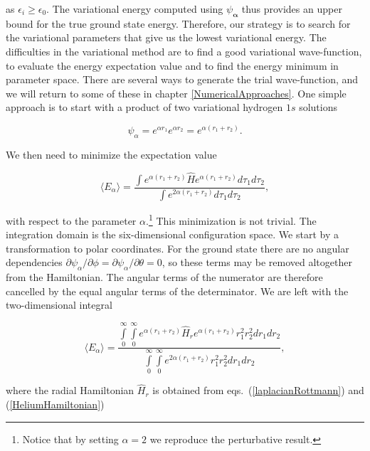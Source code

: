 as $\epsilon_{i} \ge \epsilon_{0}$. The variational energy
computed using $\psi_{\mathbf{\alpha}}$ thus provides an upper bound
for the true ground state energy. Therefore, our strategy is to 
search for the variational parameters that give us the lowest
variational energy. 
\newline
%
\newline
The difficulties in the variational method are to find a good
variational wave-function, to evaluate the energy expectation value and
to find the energy minimum in parameter space. There are several ways
to generate the trial wave-function, and we will return to some of
these in chapter \ref{NumericalApproaches}. One simple approach is to
start with a product of two variational hydrogen $1s$ solutions 

\begin{equation*} 
  \psi_{\alpha} 
  = e^{\alpha r_1}e^{\alpha r_2} = e^{\alpha (r_1+r_2)}.
\end{equation*}

We then need to minimize the expectation value

\begin{equation*} 
  \langle E_{\alpha} \rangle = 
  \frac{\int e^{\alpha (r_1+r_2)} \hat{H} e^{\alpha (r_1+r_2)}
  d\tau_1d\tau_2}
       {\int e^{2\alpha (r_1+r_2)} d\tau_1d\tau_2},
\end{equation*}

with respect to the parameter $\alpha$.\footnote{Notice that by
  setting $\alpha=2$ we reproduce the perturbative result.}
This minimization is not trivial. The integration domain is the
six-dimensional configuration space. We start by a transformation to
polar coordinates. For the ground state there are no angular
dependencies $\partial\psi_{\alpha}/\partial\phi
=\partial\psi_{\alpha}/\partial\theta = 0$, so these terms may be
removed altogether from the Hamiltonian. The angular terms of the
numerator are therefore cancelled by the equal angular terms of the
determinator. We are left with the two-dimensional integral  

\begin{equation} 
  \langle E_{\alpha} \rangle = 
  \frac{\int\limits_0^{\infty}\int\limits_0^{\infty} e^{\alpha
      (r_1+r_2)} \hat{H}_r  e^{\alpha (r_1+r_2)} r_1^2 r_2^2 dr_1 dr_2}
       {\int\limits_0^{\infty}\int\limits_0^{\infty} e^{2\alpha
	   (r_1+r_2)} r_1^2 r_2^2 dr_1 dr_2},
\label{variationalHeliumApproach}
\end{equation}

where the radial Hamiltonian $\hat{H}_r$ is obtained from
eqs.~(\ref{laplacianRottmann}) and (\ref{HeliumHamiltonian})

